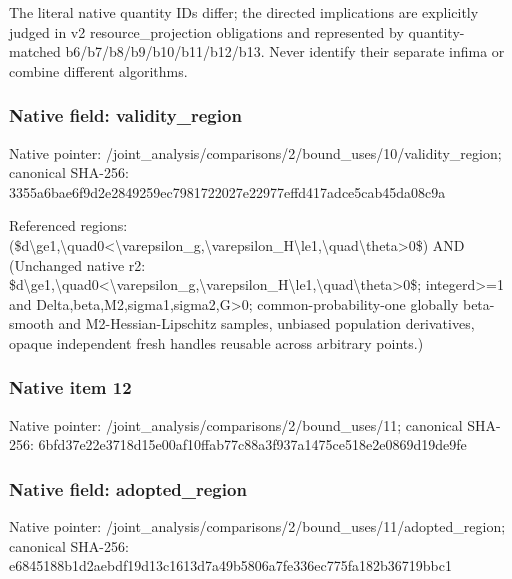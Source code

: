 \documentclass[10pt,a4paper]{article}
\begin{document}
\begingroup\raggedright\sloppy The literal native quantity IDs differ;\allowbreak{} the directed implications are explicitly judged in v2 resource\_\allowbreak{}projection obligations and represented by quantity-matched b6/\allowbreak{}b7/\allowbreak{}b8/\allowbreak{}b9/\allowbreak{}b10/\allowbreak{}b11/\allowbreak{}b12/\allowbreak{}b13. Never identify their separate infima or combine different algorithms.\par\endgroup

\subsubsection{Native field: validity\_\allowbreak{}region}
Native pointer: /joint\_\allowbreak{}analysis/comparisons/2/bound\_\allowbreak{}uses/10/validity\_\allowbreak{}region; canonical SHA-256: 3355a6bae6f9d2e2849259ec7981722027e22977effd417adce5cab45da08c9a

\begingroup\raggedright\sloppy Referenced regions:\allowbreak{} (\$d\textbackslash{}ge1,\allowbreak{}\textbackslash{}quad0<\textbackslash{}varepsilon\_\allowbreak{}g,\allowbreak{}\textbackslash{}varepsilon\_\allowbreak{}H\textbackslash{}le1,\allowbreak{}\textbackslash{}quad\textbackslash{}theta>0\$) AND (Unchanged native r2:\allowbreak{} \$d\textbackslash{}ge1,\allowbreak{}\textbackslash{}quad0<\textbackslash{}varepsilon\_\allowbreak{}g,\allowbreak{}\textbackslash{}varepsilon\_\allowbreak{}H\textbackslash{}le1,\allowbreak{}\textbackslash{}quad\textbackslash{}theta>0\$;\allowbreak{} integerd>=\allowbreak{}1 and Delta,\allowbreak{}beta,\allowbreak{}M2,\allowbreak{}sigma1,\allowbreak{}sigma2,\allowbreak{}G>0;\allowbreak{} common-probability-one globally beta-smooth and M2-Hessian-Lipschitz samples,\allowbreak{} unbiased population derivatives,\allowbreak{} opaque independent fresh handles reusable across arbitrary points.)\par\endgroup

\subsubsection{Native item 12}
Native pointer: /joint\_\allowbreak{}analysis/comparisons/2/bound\_\allowbreak{}uses/11; canonical SHA-256: 6bfd37e22e3718d15e00af10ffab77c88a3f937a1475ce518e2e0869d19de9fe

\subsubsection{Native field: adopted\_\allowbreak{}region}
Native pointer: /joint\_\allowbreak{}analysis/comparisons/2/bound\_\allowbreak{}uses/11/adopted\_\allowbreak{}region; canonical SHA-256: e6845188b1d2aebdf19d13c1613d7a49b5806a7fe336ec775fa182b36719bbc1
\end{document}
